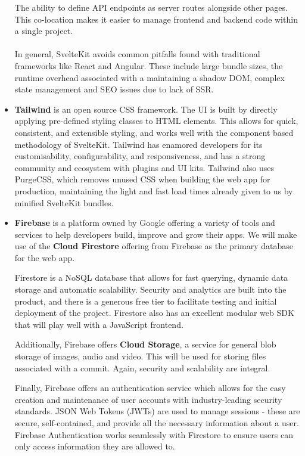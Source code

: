 \documentclass[12pt,a4paper]{article}
\begin{document}
\begin{itemize}
    The ability to define API endpoints as server routes alongside other pages. This co-location makes it easier to manage frontend and backend code within a single project.
    \\\\
    In general, SvelteKit avoids common pitfalls found with traditional frameworks like React and Angular. These include large bundle sizes, the runtime overhead associated with a maintaining a shadow DOM, complex state management and SEO issues due to lack of SSR.
    \item \textbf{Tailwind} is an open source CSS framework. The UI is built by directly applying pre-defined styling classes to HTML elements. This allows for quick, consistent, and extensible styling, and works well with the component based methodology of SvelteKit. Tailwind has enamored developers for its customisability, configurability, and responsiveness, and has a strong community and ecosystem with plugins and UI kits. Tailwind also uses PurgeCSS, which removes unused CSS when building the web app for production, maintaining the light and fast load times already given to us by minified SvelteKit bundles.
    \item \textbf{Firebase} is a platform owned by Google offering a variety of tools and services to help developers build, improve and grow their apps. We will make use of the \textbf{Cloud Firestore} offering from Firebase as the primary database for the web app. 
    
    Firestore is a NoSQL database that allows for fast querying, dynamic data storage and automatic scalability. Security and analytics are built into the product, and there is a generous free tier to facilitate testing and initial deployment of the project. Firestore also has an excellent modular web SDK that will play well with a JavaScript frontend. 
    
    Additionally, Firebase offers \textbf{Cloud Storage}, a service for general blob storage of images, audio and video. This will be used for storing files associated with a commit. Again, security and scalability are integral. 
    
    Finally, Firebase offers an authentication service which allows for the easy creation and maintenance of user accounts with industry-leading security standards. JSON Web Tokens (JWTs) are used to manage sessions - these are secure, self-contained, and provide all the necessary information about a user. Firebase Authentication works seamlessly with Firestore to ensure users can only access information they are allowed to.
\end{itemize}
\end{document}
